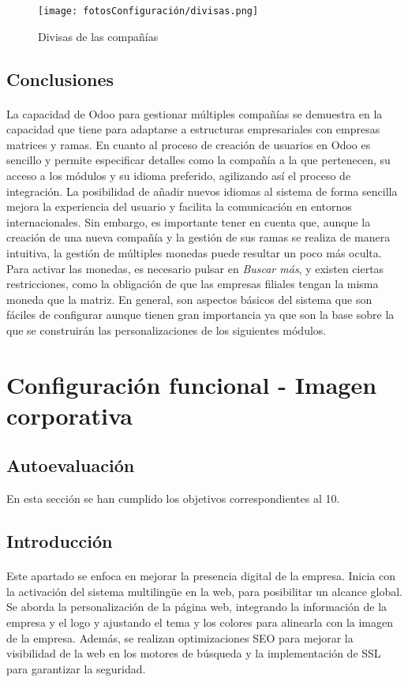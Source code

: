 \begin{figure}[h]
    \centering
    \texttt{[image: fotosConfiguración/divisas.png]}
    \caption{Divisas de las compañías}
    \label{fig:enter-label}
\end{figure}
\subsection{Conclusiones}
\paragraph{}
La capacidad de Odoo para gestionar múltiples compañías se demuestra en la capacidad que tiene para adaptarse a estructuras empresariales con empresas matrices y ramas.
En cuanto al proceso de creación de usuarios en Odoo es sencillo y permite especificar detalles como la compañía a la que pertenecen, su acceso a los módulos y su idioma preferido, agilizando así el proceso de integración. La posibilidad de añadir nuevos idiomas al sistema de forma sencilla mejora la experiencia del usuario y facilita la comunicación en entornos internacionales.
Sin embargo, es importante tener en cuenta que, aunque la creación de una nueva compañía y la gestión de sus ramas se realiza de manera intuitiva, la gestión de múltiples monedas puede resultar un poco más oculta. Para activar las monedas, es necesario pulsar en \textit{Buscar más}, y existen ciertas restricciones, como la obligación de que las empresas filiales tengan la misma moneda que la matriz.
En general, son aspectos básicos del sistema que son fáciles de configurar aunque tienen gran importancia ya que son la base sobre la que se construirán las personalizaciones de los siguientes módulos.
\newpage
\section{Configuración funcional - Imagen corporativa}
\subsection{Autoevaluación}
En esta sección se han cumplido los objetivos correspondientes al 10.
\subsection{Introducción}
\paragraph{}
Este apartado se enfoca en mejorar la presencia digital de la empresa. Inicia con la activación del sistema multilingüe en la web, para posibilitar un alcance global. Se aborda la personalización de la página web, integrando la información de la empresa y el logo y ajustando el tema y los colores para alinearla con la imagen de la empresa. Además, se realizan optimizaciones SEO para mejorar la visibilidad de la web en los motores de búsqueda y la implementación de SSL para garantizar la seguridad.
